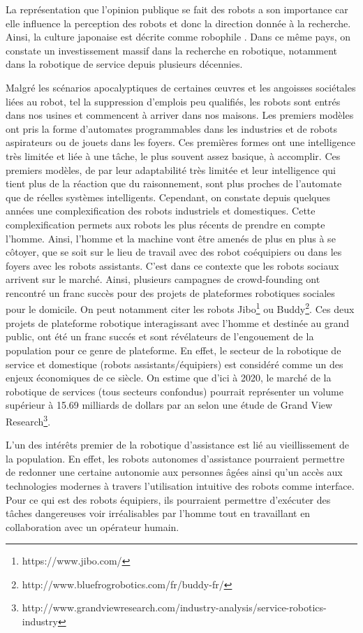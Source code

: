 \documentclass[a4paper,11pt,twoside]{StyleThese}
\begin{document}
La représentation que l'opinion publique se fait des robots a son importance car elle influence la perception des robots \cite{Sundar2016} et donc la direction donnée à la recherche. Ainsi, la culture japonaise est décrite comme robophile \cite{gilson98}. Dans ce même pays, on constate un investissement massif dans la recherche en robotique, notamment dans la robotique de service depuis plusieurs décennies.

Malgré les scénarios apocalyptiques de certaines œuvres et les angoisses sociétales liées au robot, tel la suppression d’emplois peu qualifiés, les robots sont entrés dans nos usines et commencent à arriver dans nos maisons. Les premiers modèles ont pris la forme d'automates programmables dans les industries et de robots aspirateurs ou de jouets dans les foyers. Ces premières formes ont une intelligence très limitée et liée à une tâche, le plus souvent assez basique, à accomplir. Ces premiers modèles, de par leur adaptabilité très limitée et leur intelligence qui tient plus de la réaction que du raisonnement, sont plus proches de l'automate que  de réelles systèmes intelligents. Cependant, on constate depuis quelques années une complexification des robots industriels et domestiques. Cette complexification permets aux robots les plus récents de prendre en compte l'homme. Ainsi, l'homme et la machine vont être amenés de plus en plus à se côtoyer, que se soit sur le lieu de travail avec des robot coéquipiers ou dans les foyers avec les robots assistants. C'est dans ce contexte que les robots sociaux arrivent sur le marché. Ainsi, plusieurs campagnes de crowd-founding ont rencontré un franc succès pour des projets de plateformes robotiques sociales pour le domicile. On peut notamment citer les robots Jibo\footnote{https://www.jibo.com/} ou Buddy\footnote{http://www.bluefrogrobotics.com/fr/buddy-fr/}. Ces deux projets de plateforme robotique interagissant avec l'homme et destinée au grand public, ont été un franc succés et sont révélateurs de l'engouement de la population pour ce genre de plateforme. En effet, le secteur de la robotique de service et domestique (robots assistants/équipiers) est considéré comme un des enjeux
économiques de ce siècle. On estime que d’ici à 2020, le marché de la robotique de services (tous secteurs confondus) pourrait représenter un volume supérieur à 15.69 milliards de dollars par an selon une étude de Grand View Research\footnote{http://www.grandviewresearch.com/industry-analysis/service-robotics-industry}. 

L'un des intérêts premier de la robotique d'assistance est lié au vieillissement de la population. En effet, les robots autonomes d'assistance pourraient permettre de redonner une certaine autonomie aux personnes âgées ainsi qu'un accès aux technologies modernes à travers l'utilisation intuitive des robots comme interface.
Pour ce qui est des robots équipiers, ils pourraient permettre d'exécuter des tâches dangereuses voir irréalisables par l'homme tout en travaillant en collaboration avec un opérateur humain. 
\end{document}
